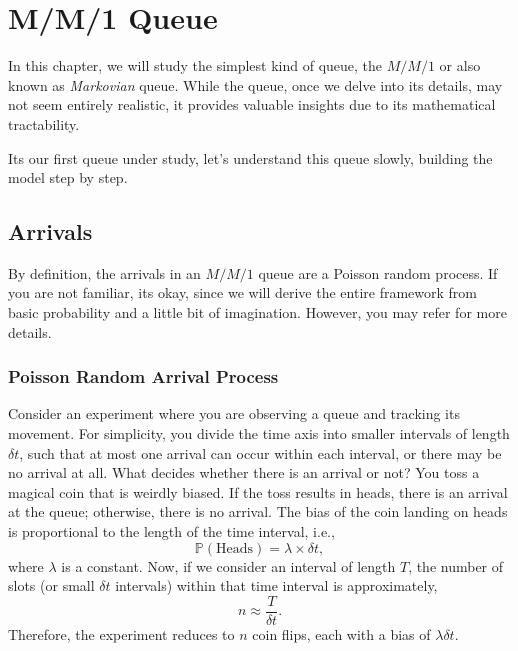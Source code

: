 \documentclass[11pt, a4paper]{report}
\begin{document}
\chapter{M/M/1 Queue}
In this chapter, we will study the simplest kind of queue, the $M/M/1$ or also known as \emph{Markovian} queue. While the queue, once we delve into its details, may not seem entirely realistic, it provides valuable insights due to its mathematical tractability.


Its our first queue under study, let's understand this queue slowly, building the model step by step.

\section{Arrivals}
By definition, the arrivals in an $M/M/1$ queue are a Poisson random process. If you are not familiar, its okay, since we will derive the entire framework from basic probability and a little bit of imagination. However, you may refer \cite{pishro2014introduction} for more details.

\subsection{Poisson Random Arrival Process}
Consider an experiment where you are observing a queue and tracking its movement. For simplicity, you divide the time axis into smaller intervals of length $\delta t$, such that at most one arrival can occur within each interval, or there may be no arrival at all. What decides whether there is an arrival or not? You toss a magical coin that is weirdly biased. If the toss results in heads, there is an arrival at the queue; otherwise, there is no arrival. The bias of the coin landing on heads is proportional to the length of the time interval, i.e., 
$$\mathbb{P}(\text{Heads}) = \lambda \times \delta t,$$ 
where $\lambda$ is a constant. Now, if we consider an interval of length $T$, the number of slots (or small $\delta t$ intervals) within that time interval is approximately, 
$$n \approx \frac{T}{\delta t}.$$ 
Therefore, the experiment reduces to $n$ coin flips, each with a bias of $\lambda \delta t$. 
\end{document}
